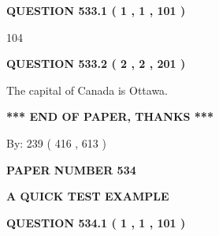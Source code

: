 \documentclass[12pt]{article}
\begin{document}
{\textbf{\Large{QUESTION
533.1 
 ( 1 , 1 , 101 )
}}}
  
  
 
 
\noindent{}

104
 
 
  
\vspace{0.2in}
  
{\textbf{\Large{QUESTION
533.2 
 ( 2 , 2 , 201 )
}}}
  
  
 
 
\noindent{}
 
 
The capital of Canada is Ottawa.
 
 
 
 
   
   
 \vspace{0.2in}
 
   
   
   
   
\vspace{1.0in} 
{\textbf{\large{ *** END OF PAPER, THANKS *** }}} 
   
   
\hspace{1.0in} By: 
 239 ( 416 ,  613 )
   
   
   
   
\newpage 
\setcounter{page}{ 
   534001 } 
   
   
   
   
 {\textbf{ \Large{ PAPER NUMBER  534  }}}
   
   
\vspace{0.2in}
   
   
   
   
   
   
 \vspace{0.2in}
{\LARGE {\textbf{ A QUICK TEST EXAMPLE}}}
   
   
  
\vspace{0.2in}
  
{\textbf{\Large{QUESTION
534.1 
 ( 1 , 1 , 101 )
}}}
  
  
 
 
\noindent{}
\end{document}
